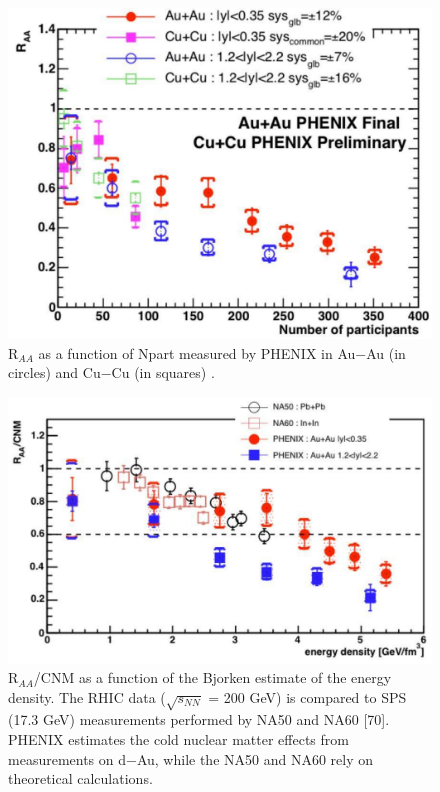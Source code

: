 \begin{figure}
  \includegraphics[width=\hugefigwidth]{chap_QuarkoniaSurvey_figures/RHIC_JPsi_219_1}
  \caption[JPsiRHICPhenix]{R$_{AA}$ as a function of Npart measured by PHENIX in Au$-$Au (in circles) and Cu$-$Cu (in squares) \cite{Phenix2}.}
   \label{fig:JPsiAtPHENIX1}
\end{figure}


\begin{figure}
  \includegraphics[width=\hugefigwidth]{chap_QuarkoniaSurvey_figures/RHIC_JPsi_219_2}
  \caption[JPsiRHICPhenix2]{R$_{AA}$/CNM as a function of the Bjorken estimate of the energy
     density. The RHIC data ($\sqrt{s_{NN}}$ = 200 GeV) is compared to SPS (17.3 GeV)
     measurements performed by NA50 and NA60 [70]. PHENIX estimates the cold nuclear matter 
     effects from measurements on d$-$Au, while the NA50 and NA60 rely on theoretical calculations.}
   \label{fig:JPsiAtPHENIX2}
\end{figure}

